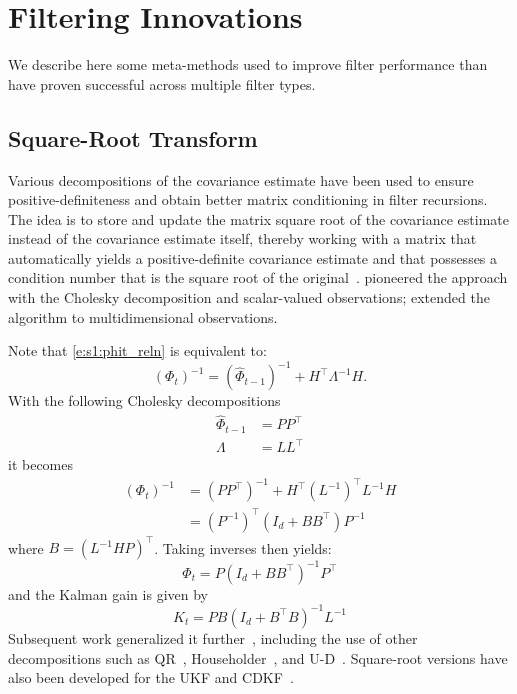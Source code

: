 \section{Filtering Innovations} 

We describe here some meta-methods used to improve filter performance than have proven successful across multiple filter types.

\subsection{Square-Root Transform} 
Various decompositions of the covariance estimate have been used to ensure positive-definiteness and obtain better matrix conditioning in filter recursions.  The idea is to store and update the matrix square root of the covariance estimate instead of the covariance estimate itself, thereby working with a matrix that automatically yields a positive-definite covariance estimate and that possesses a condition number that is the square root of the original~\cite{And79}. \textcite{Pot63} pioneered the approach with the Cholesky decomposition and scalar-valued observations; \textcite{Bel67} extended the algorithm to multidimensional observations.

Note that \eqref{e:s1:phit_reln} is equivalent to:
\begin{equation}
(\Phi_t)^{-1} = (\hat\Phi_{t-1})^{-1} + H^\intercal\Lambda^{-1}H.
\end{equation}
With the following Cholesky decompositions
\begin{align}
\hat\Phi_{t-1} &= PP^\intercal \\
\Lambda &= LL^\intercal
\end{align}
it becomes
\begin{align}
(\Phi_t)^{-1} 
&= (PP^\intercal)^{-1} + H^\intercal(L^{-1})^\intercal L^{-1}H \\
&= (P^{-1})^\intercal (I_d+BB^\intercal) P^{-1}
\end{align}
where $B = (L^{-1}HP)^\intercal$.  Taking inverses then yields:
\begin{equation}
\Phi_t = P(I_d+BB^\intercal)^{-1}P^\intercal
\end{equation}
and the Kalman gain is given by
\begin{equation}
K_t = PB(I_d+B^\intercal B)^{-1}L^{-1}
\end{equation}
Subsequent work generalized it further~\cite{And68,Sch70b,Kam71}, including the use of other decompositions such as QR~\cite{Say93,Say94}, Householder~\cite{Dye69,Car73}, and U-D~\cite{Bie75,Tho76}.  Square-root versions have also been developed for the UKF and CDKF~\cite{van01}.

